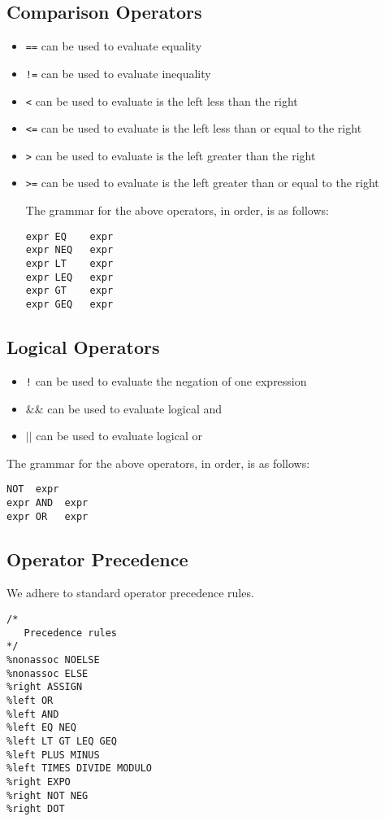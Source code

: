 \documentclass{article}
\begin{document}
\subsection{Comparison Operators}
\begin{itemize}
\item \texttt{==} can be used to evaluate equality
\item \texttt{!=} can be used to evaluate inequality
\item \texttt{<} can be used to evaluate is the left less than the right
\item \texttt{<=} can be used to evaluate is the left less than or equal to the right
\item \texttt{>} can be used to evaluate is the left greater than the right
\item \texttt{>=} can be used to evaluate is the left greater than or equal to the right

The grammar for the above operators, in order, is as follows:
\begin{Verbatim}[frame=single]
expr EQ    expr
expr NEQ   expr
expr LT    expr
expr LEQ   expr
expr GT    expr
expr GEQ   expr
\end{Verbatim}
\end{itemize}

\subsection{Logical Operators}
\begin{itemize}
\item \texttt{!} can be used to evaluate the negation of one expression
\item \texttt{$\&\&$} can be used to evaluate logical and
\item \texttt{$\vert\vert$} can be used to evaluate logical or
\end{itemize}

The grammar for the above operators, in order, is as follows:
\begin{Verbatim}[frame=single]
NOT  expr
expr AND  expr
expr OR   expr
\end{Verbatim}

\subsection{Operator Precedence}
We adhere to standard operator precedence rules. 


\begin{Verbatim}[frame=single]
/* 
   Precedence rules 
*/
%nonassoc NOELSE 
%nonassoc ELSE 
%right ASSIGN 
%left OR
%left AND
%left EQ NEQ
%left LT GT LEQ GEQ 
%left PLUS MINUS 
%left TIMES DIVIDE MODULO
%right EXPO
%right NOT NEG
%right DOT
\end{Verbatim}
\end{document}
